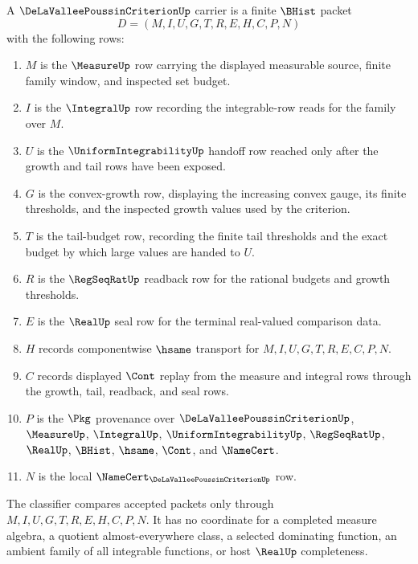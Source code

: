 \begin{definition}\label{def:de-la-vallee-poussin-carrier}
A $\DeLaValleePoussinCriterionUp$ carrier is a finite $\BHist$ packet
$$
D=(M,I,U,G,T,R,E,H,C,P,N)
$$
with the following rows:
\begin{enumerate}
\item $M$ is the $\MeasureUp$ row carrying the displayed measurable source, finite family window, and inspected set budget.
\item $I$ is the $\IntegralUp$ row recording the integrable-row reads for the family over $M$.
\item $U$ is the $\UniformIntegrabilityUp$ handoff row reached only after the growth and tail rows have been exposed.
\item $G$ is the convex-growth row, displaying the increasing convex gauge, its finite thresholds, and the inspected growth values used by the criterion.
\item $T$ is the tail-budget row, recording the finite tail thresholds and the exact budget by which large values are handed to $U$.
\item $R$ is the $\RegSeqRatUp$ readback row for the rational budgets and growth thresholds.
\item $E$ is the $\RealUp$ seal row for the terminal real-valued comparison data.
\item $H$ records componentwise $\hsame$ transport for $M,I,U,G,T,R,E,C,P,N$.
\item $C$ records displayed $\Cont$ replay from the measure and integral rows through the growth, tail, readback, and seal rows.
\item $P$ is the $\Pkg$ provenance over $\DeLaValleePoussinCriterionUp$, $\MeasureUp$, $\IntegralUp$, $\UniformIntegrabilityUp$, $\RegSeqRatUp$, $\RealUp$, $\BHist$, $\hsame$, $\Cont$, and $\NameCert$.
\item $N$ is the local $\NameCert_{\DeLaValleePoussinCriterionUp}$ row.
\end{enumerate}
The classifier compares accepted packets only through $M,I,U,G,T,R,E,H,C,P,N$. It has no coordinate for a completed measure algebra, a quotient almost-everywhere class, a selected dominating function, an ambient family of all integrable functions, or host $\RealUp$ completeness.
\end{definition}

